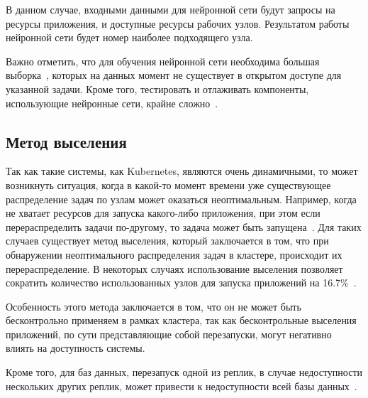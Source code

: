 В данном случае, входными данными для нейронной сети будут запросы на ресурсы приложения, и доступные ресурсы рабочих узлов. Результатом работы нейронной сети будет номер наиболее подходящего узла.

Важно отметить, что для обучения нейронной сети необходима большая выборка~\cite{elman1993learning}, которых на данных момент не существует в открытом доступе для указанной задачи. Кроме того, тестировать и отлаживать компоненты, использующие нейронные сети, крайне сложно~\cite{sun2018testing}.

\subsection{Метод выселения}

Так как такие системы, как Kubernetes, являются очень динамичными, то может возникнуть ситуация, когда в какой-то момент времени уже существующее распределение задач по узлам может оказаться неоптимальным. Например, когда не хватает ресурсов для запуска какого-либо приложения, при этом если перераспределить задачи по-другому, то задача может быть запущена~\cite{descheduler}. Для таких случаев существует метод выселения, который заключается в том, что при обнаружении неоптимального распределения задач в кластере, происходит их перераспределение. В некоторых случаях использование выселения позволяет сократить количество использованных узлов для запуска приложений на 16.7\%~\cite{larsson2023impact}.

Особенность этого метода заключается в том, что он не может быть бесконтрольно применяем в рамках кластера, так как бесконтрольные выселения приложений, по сути представляющие собой перезапуски, могут негативно влиять на доступность системы. 

Кроме того, для баз данных, перезапуск одной из реплик, в случае недоступности нескольких других реплик, может привести к недоступности всей базы данных~\cite{ongaro2015raft}.


